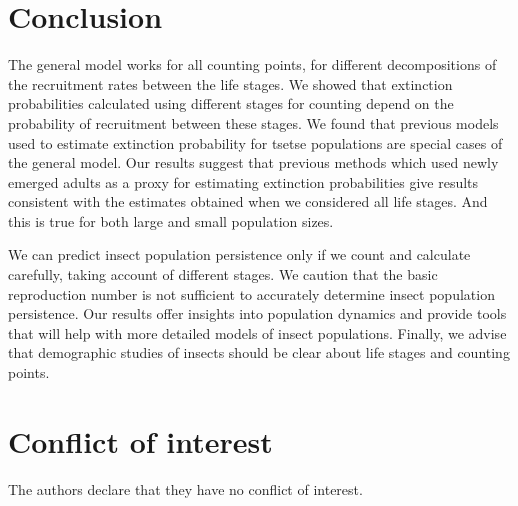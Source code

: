 \documentclass[smallextended]{svjour3}
\begin{document}
	\section{Conclusion}
	\label{Conclusion}
	The general model works for all counting points, for different decompositions of the recruitment rates between the life stages. We showed that extinction probabilities calculated using different stages for counting depend on the probability of recruitment between these stages. We found that previous models used to estimate extinction probability for tsetse populations are special cases of the general model. Our results suggest that previous methods which used newly emerged adults as a proxy for estimating extinction probabilities give  results consistent with the estimates obtained when we considered all life stages. And this is true for both large and small population sizes.
	
	We can predict insect population persistence only if we count and calculate carefully, taking account of different stages. We caution that the basic reproduction number is not sufficient to accurately determine insect population persistence. Our results offer insights into population dynamics and provide tools that will help with more detailed models of insect populations. Finally, we advise that demographic studies of insects should be clear about life stages and counting points.
	
	
	
	\section*{Conflict of interest}
	The authors declare that they have no conflict of interest.
	
	\nocite{*}
	
\end{document}
